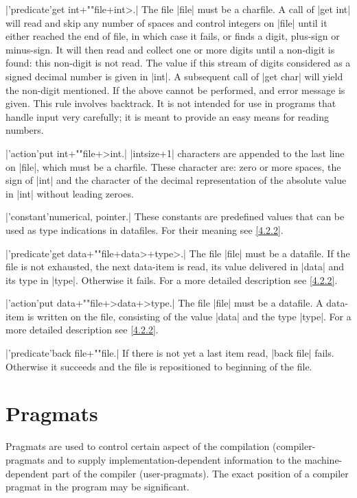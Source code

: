 \documentclass{article}
\newcommand\g[1]{{\sf #1}}
\let\oref\ref
\let\ref\oref
\begin{document}
\X\pp|'predicate'get int+""file+int>.|\Y
The file \pp|file| must be a charfile. A call of \pp|get int| will read and
skip any number of spaces and control integers on \pp|file| until it either
reached the end of file, in which case it fails, or finds a digit, plus-sign
or minus-sign. It will then read and collect one or more digits until a
non-digit is found: this non-digit is not read. The value if this stream of
digits considered as a signed decimal number is given in \pp|int|.
A subsequent call of \pp|get char| will yield the non-digit mentioned. If
the above cannot be performed, and error message is given.
This rule involves backtrack. It is not intended for use in programs that
handle input very carefully; it is meant to provide an easy means for
reading numbers.

\X\pp|'action'put int+""file+>int.|\Y
\pp|intsize+1| characters are appended to the last line on \pp|file|, which
must be a charfile. These character are: zero or more spaces, the sign of
\pp|int| and the character of the decimal representation of the absolute
value in \pp|int| without leading zeroes.

\X\pp|'constant'numerical, pointer.|\Y
These constants are predefined values that can be used as type indications
in datafiles. For their meaning see \ref{4.2.2}.

\X\pp|'predicate'get data+""file+data>+type>.|\Y
The file \pp|file| must be a datafile. If the file is not exhausted, the
next data-item is read, its value delivered in \pp|data| and its type in
\pp|type|. Otherwise it fails. For a more detailed description see
\ref{4.2.2}.

\X\pp|'action'put data+""file+>data+>type.|\Y
The file \pp|file| must be a datafile. A data-item is written on the file,
consisting of the value \pp|data| and the type \pp|type|. For a more
detailed description see \ref{4.2.2}.

\X\pp|'predicate'back file+""file.|\Y
If there is not yet a last item read, \pp|back file| fails. Otherwise it
succeeds and the file is repositioned to
beginning of the file.

\newpage
\section{Pragmats}\label{sec:6}

Pragmats are used to control certain aspect of the compilation
(\g{compiler-pragmats} and to supply implementation-dependent information to
the machine-dependent part of the compiler (\g{user-pragmats}). The exact
position of a compiler pragmat in the program may be significant.
\end{document}
